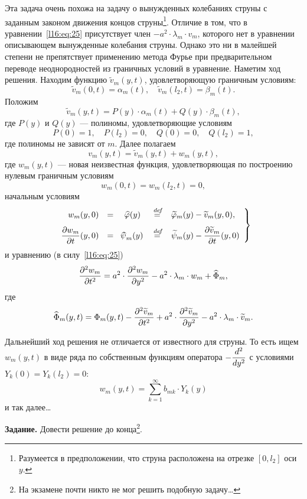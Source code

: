 Эта задача очень похожа на задачу о вынужденных колебаниях струны с заданным законом движения концов струны\footnote{Разумеется в предположении, что струна расположена на отрезке $[0,l_2]$ оси $y$.}. Отличие в том, что в уравнении~\eqref{l16:eq:25} присутствует член $-a^2\cdot\lambda_m\cdot v_m$, которого нет в уравнении описывающем вынужденные колебания струны. Однако это ни в малейшей степени не препятствует применению метода Фурье при предварительном переводе неоднородностей из граничных условий в уравнение. Наметим ход решения. Находим функцию $\widetilde{v}_m(y,t)$, удовлетворяющую граничным условиям: 
\begin{equation*}
	\widetilde{v}_m(0,t)=\alpha_m(t),\quad\widetilde{v}_m(l_2,t)=\beta_m(t).
\end{equation*}  
Положим
\begin{equation*}
	 \widetilde{v}_m(y,t)=P(y)\cdot\alpha_m(t)+Q(y)\cdot\beta_m(t),
\end{equation*}
где $P(y)$ и $Q(y)$ --- полиномы, удовлетворяющие условиям 
\begin{equation*}
	 P(0)=1,\quad P(l_2)=0,\quad Q(0)=0,\quad Q(l_2)=1,
\end{equation*}
где полиномы не зависят от $m$. Далее полагаем 
\begin{equation*}
	 v_m(y,t)=\widetilde{v}_m(y,t)+w_m(y,t),
\end{equation*}
где $w_m(y,t)$ --- новая неизвестная функция, удовлетворяющая по построению нулевым граничным условиям
\begin{equation}\label{l16:eq:28}
	 w_m(0,t)=w_m(l_2,t)=0,
\end{equation}
начальным условиям 
\begin{equation}\label{l16:eq:29}
	\left.\begin{array}{rcccl}
		w_m(y,0)&=&\widehat{\phi}(y)&\eqdef&\widetilde{\phi}_m(y)-\widetilde{v}_m(y,0),\\[8pt]
		\displaystyle \pder{w_m}{t}(y,0)&=&\psihat_m(y)&\eqdef&\displaystyle\widetilde{\psi}_m(y)-\pder{\widetilde{v}_m}{t}(y,0)
	\end{array}\right\}
\end{equation}
и уравнению (в силу~\eqref{l16:eq:25})
\begin{equation}\label{l16:eq:30}
	\frac{\partial^2w_m}{\partial t^2}=a^2\cdot\frac{\partial^2w_m}{\partial y^2}-a^2\cdot\lambda_m\cdot w_m+\widehat{\Phi}_m,
\end{equation}
где 
\begin{equation*}
	\widehat{\Phi}_m(y,t)=\Phi_m(y,t)-\frac{\partial^2\widetilde{v}_m}{\partial t^2}+a^2\cdot\frac{\partial^2\widetilde{v}_m}{\partial y^2}-a^2\cdot\lambda_m\cdot \widetilde{v}_m.
\end{equation*}

Дальнейший ход решения не отличается от известного для струны. То есть ищем $w_m(y,t)$ в виде ряда по собственным функциям оператора $\displaystyle-\frac{d^2}{dy^2}$ с условиями $Y_k(0)=Y_k(l_2)=0$:
\begin{equation*}
	 w_m(y,t)=\sum\limits_{k=1}^{\infty}b_{mk}\cdot Y_k(y)
\end{equation*}
и так далее\dots
\vspace{0.2cm}

\noindent\textbf{Задание.} Довести решение до конца\footnote{На экзамене почти никто не мог решить подобную задачу\dots}.